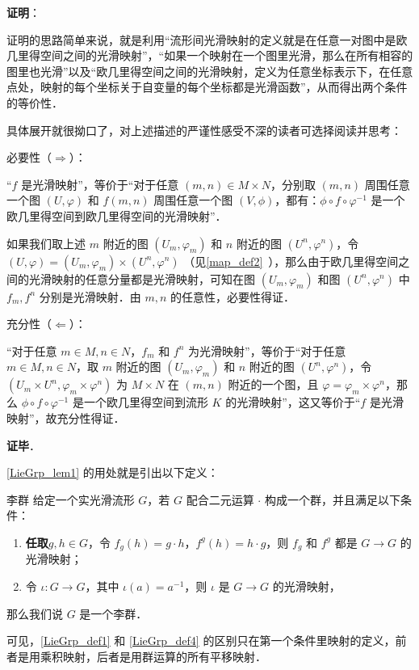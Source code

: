 \textbf{证明}：

证明的思路简单来说，就是利用“流形间光滑映射的定义就是在任意一对图中是欧几里得空间之间的光滑映射”，“如果一个映射在一个图里光滑，那么在所有相容的图里也光滑”以及“欧几里得空间之间的光滑映射，定义为任意坐标表示下，在任意点处，映射的每个坐标关于自变量的每个坐标都是光滑函数”，从而得出两个条件的等价性．

具体展开就很拗口了，对上述描述的严谨性感受不深的读者可选择阅读并思考：

必要性（$\Rightarrow$）：

“$f$ 是光滑映射”，等价于“对于任意 $(m, n)\in M\times N$，分别取 $(m, n)$ 周围任意一个图 $(U, \varphi)$ 和 $f(m, n)$ 周围任意一个图 $(V, \phi)$，都有：$\phi\circ f\circ\varphi^{-1}$ 是一个欧几里得空间到欧几里得空间的光滑映射”．

如果我们取上述 $m$ 附近的图 $(U_m, \varphi_m)$ 和 $n$ 附近的图 $(U^n, \varphi^n)$，令 $(U, \varphi)=(U_m, \varphi_m)\times(U^n, \varphi^n)$ （见\autoref{map_def2}~），那么由于欧几里得空间之间的光滑映射的任意分量都是光滑映射，可知在图 $(U_m, \varphi_m)$ 和图 $(U^n, \varphi^n)$ 中 $f_m, f^n$ 分别是光滑映射．由 $m, n$ 的任意性，必要性得证．

充分性（$\Leftarrow$）：

“对于任意 $m\in M, n\in N$，$f_m$ 和 $f^n$ 为光滑映射”，等价于“对于任意 $m\in M, n\in N$，取 $m$ 附近的图 $(U_m, \varphi_m)$ 和 $n$ 附近的图 $(U^n, \varphi^n)$，令 $(U_m\times U^n, \varphi_m\times\varphi^n)$ 为 $M\times N$ 在 $(m, n)$ 附近的一个图，且 $\varphi=\varphi_m\times\varphi^n$，那么 $\phi\circ f\circ\varphi^{-1}$ 是一个欧几里得空间到流形 $K$ 的光滑映射”，这又等价于“$f$ 是光滑映射”，故充分性得证．

\textbf{证毕}．

\autoref{LieGrp_lem1} 的用处就是引出以下定义：

\begin{definition}{李群}\label{LieGrp_def4}
给定一个实光滑流形 $G$，若 $G$ 配合二元运算 $\cdot$ 构成一个群，并且满足以下条件：
\begin{enumerate}
\item \textbf{任取}$g, h\in G$，令 $f_g(h)=g\cdot h$，$f^g(h)=h\cdot g$，则 $f_g$ 和 $f^g$ 都是 $G\to G$ 的光滑映射；
\item 令 $\iota:G\to G$，其中 $\iota(a)=a^{-1}$，则 $\iota$ 是 $G\to G$ 的光滑映射，
\end{enumerate}
那么我们说 $G$ 是一个李群．
\end{definition}

可见，\autoref{LieGrp_def1} 和 \autoref{LieGrp_def4} 的区别只在第一个条件里映射的定义，前者是用乘积映射，后者是用群运算的所有平移映射．

